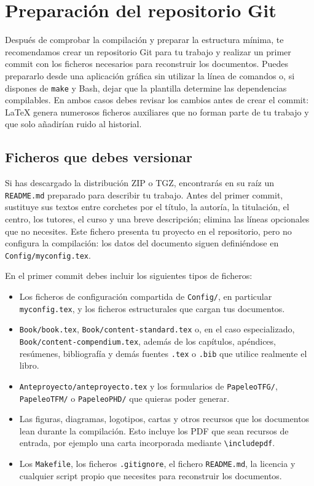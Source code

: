 \section{Preparación del repositorio Git}
\label{sec:preparacion-repositorio-git}

Después de comprobar la compilación y preparar la estructura mínima, te recomendamos crear un repositorio Git para tu trabajo y realizar un primer commit con los ficheros necesarios para reconstruir los documentos. Puedes prepararlo desde una aplicación gráfica sin utilizar la línea de comandos o, si dispones de \texttt{make} y Bash, dejar que la plantilla determine las dependencias compilables. En ambos casos debes revisar los cambios antes de crear el commit: \LaTeX{} genera numerosos ficheros auxiliares que no forman parte de tu trabajo y que solo añadirían ruido al historial.

\subsection{Ficheros que debes versionar}

Si has descargado la distribución ZIP o TGZ, encontrarás en su raíz un \texttt{README.md} preparado para describir tu trabajo. Antes del primer commit, sustituye sus textos entre corchetes por el título, la autoría, la titulación, el centro, los tutores, el curso y una breve descripción; elimina las líneas opcionales que no necesites. Este fichero presenta tu proyecto en el repositorio, pero no configura la compilación: los datos del documento siguen definiéndose en \texttt{Config/myconfig.tex}.

En el primer commit debes incluir los siguientes tipos de ficheros:

\begin{itemize}
  \item Los ficheros de configuración compartida de \texttt{Config/}, en particular \texttt{myconfig.tex}, y los ficheros estructurales que cargan tus documentos.
  \item \texttt{Book/book.tex}, \texttt{Book/content-standard.tex} o, en el caso especializado, \texttt{Book/content-compendium.tex}, además de los capítulos, apéndices, resúmenes, bibliografía y demás fuentes \texttt{.tex} o \texttt{.bib} que utilice realmente el libro.
  \item \texttt{Anteproyecto/anteproyecto.tex} y los formularios de \texttt{PapeleoTFG/}, \texttt{PapeleoTFM/} o \texttt{PapeleoPHD/} que quieras poder generar.
  \item Las figuras, diagramas, logotipos, cartas y otros recursos que los documentos lean durante la compilación. Esto incluye los PDF que sean recursos de entrada, por ejemplo una carta incorporada mediante \texttt{\textbackslash{}includepdf}.
  \item Los \texttt{Makefile}, los ficheros \texttt{.gitignore}, el fichero \texttt{README.md}, la licencia y cualquier script propio que necesites para reconstruir los documentos.
\end{itemize}


